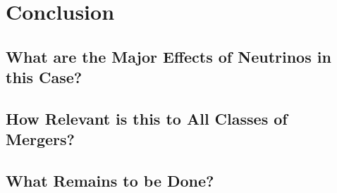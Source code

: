 \chapter{Conclusion}
\label{chap:conc}

\section{What are the Major Effects of Neutrinos in this Case?}

\section{How Relevant is this to All Classes of Mergers?}

\section{What Remains to be Done?}
